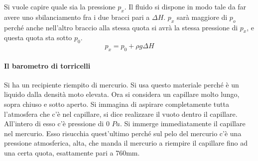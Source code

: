 \documentclass[10pt,a4paper]{book}
\begin{document}
\FloatBarrier
Si vuole capire quale sia la pressione $p_x$. Il fluido si dispone in modo tale da far avere uno sbilanciamento fra i due bracci pari a $\Delta H$. $p_x$ sarà maggiore di $p_o$ perché anche nell'altro braccio alla stessa quota si avrà la stessa pressione di $p_x$, e questa quota sta sotto $p_0$.
\[
	p_x = p_0 + \rho g\Delta H
\]

\paragraph{Il barometro di torricelli} Si ha un recipiente riempito di mercurio. Si usa questo materiale perché è un liquido dalla densità moto elevata. Ora si considera un capillare molto lungo, sopra chiuso e sotto aperto. Si immagina di aspirare completamente tutta l'atmosfera che c'è nel capillare, si dice realizzare il vuoto dentro il capillare. All'intero di esso c'è pressione di 0 $Pa$. Si immerge immediatamente il capillare nel mercurio. Esso risucchia quest'ultimo perché sul pelo del mercurio c'è una pressione atmosferica, alta, che manda il mercurio a riempire il capillare fino ad una certa quota, esattamente pari a 760mm.
\end{document}
